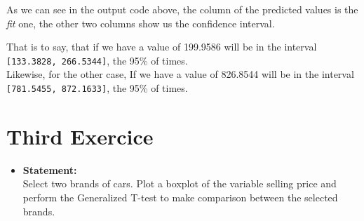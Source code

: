 \documentclass{article}
\begin{document}
\begin{itemize}
    As we can see in the output code above, the column of the predicted values is the \textit{fit} one, the other two columns show us the confidence interval.
    
    That is to say, that if we have a value of 199.9586 will be in the interval \texttt{[133.3828, 266.5344]}, the 95\% of times. \\
    Likewise, for the other case, If we have a value of 826.8544 will be in the interval \texttt{[781.5455, 872.1633]}, the 95\% of times.
\end{itemize}
    
\newpage


\section{Third Exercice}
\begin{itemize}
    \item \textbf{Statement:}\\ 
    Select two brands of cars. Plot a boxplot of the variable selling price and
    perform the Generalized T-test to make comparison between the selected
    brands.
    

\end{itemize}
\end{document}
